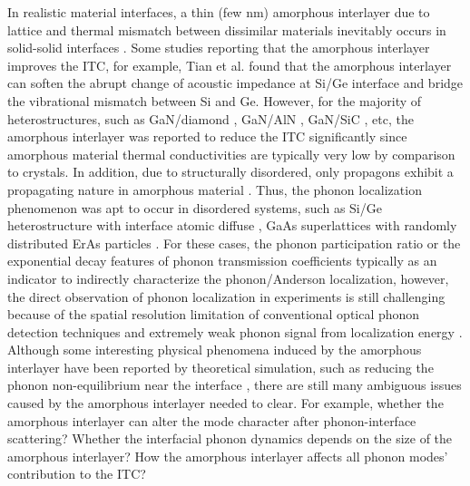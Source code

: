 \documentclass{article}
\begin{document}
       In realistic material interfaces, a thin (few nm) amorphous interlayer due to lattice and thermal mismatch between dissimilar materials inevitably occurs in solid-solid interfaces  \cite{cheng2020interfacial} \cite{mu2019high}. Some studies reporting that the amorphous interlayer improves the ITC, for example, Tian et al.  \cite{tian2012enhancing} found that the amorphous interlayer can soften the abrupt change of acoustic impedance at Si/Ge interface and bridge the vibrational mismatch between Si and Ge. However, for the majority of heterostructures, such as GaN/diamond  \cite{cheng2020interfacial}, GaN/AlN  \cite{wang2021interfacial}, GaN/SiC  \cite{mu2019high}, etc, the amorphous interlayer was reported to reduce the ITC significantly since amorphous material thermal conductivities are typically very low by comparison to crystals. In addition, due to structurally disordered, only propagons exhibit a propagating nature in amorphous material \cite{gordiz2016phonon, gordiz2017phonon, zhou2020thermal}. Thus, the phonon localization phenomenon was apt to occur in disordered systems, such as Si/Ge heterostructure with interface atomic diffuse  \cite{ni2019interface}, GaAs superlattices with randomly distributed ErAs particles  \cite{mendoza2016anderson}. For these cases, the phonon participation ratio or the exponential decay features of phonon transmission coefficients typically as an indicator to indirectly characterize the phonon/Anderson localization, however, the direct observation of phonon localization in experiments is still challenging because of the spatial resolution limitation of conventional optical phonon detection techniques and extremely weak phonon signal from localization energy  \cite{zhang2017impeded} \cite{gadre2022nanoscale}. Although some interesting physical phenomena induced by the amorphous interlayer have been reported by theoretical simulation, such as reducing the phonon non-equilibrium near the interface  \cite{li2022inelastic}, there are still many ambiguous issues caused by the amorphous interlayer needed to clear. For example, whether the amorphous interlayer can alter the mode character after phonon-interface scattering? Whether the interfacial phonon dynamics depends on the size of the amorphous interlayer? How the amorphous interlayer affects all phonon modes’ contribution to the ITC? 
\end{document}
